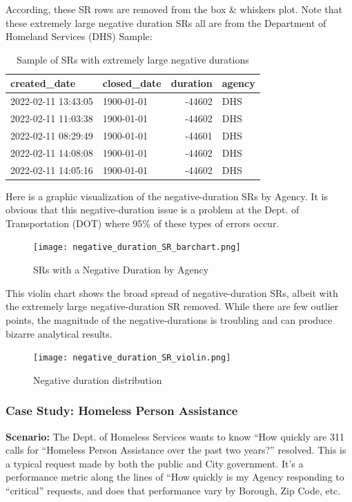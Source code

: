 \documentclass[12pt, titlepage]{article}
\begin{document}
According, these  SR rows are removed from the box \& whiskers plot. Note that these extremely large negative duration SRs all
are from the Department of Homeland Services (DHS) Sample: 

\begin{table}[H]
    \centering
    \small
    \begin{tabular}{l l r l}
        \toprule
        \textbf{created\_date} & \textbf{closed\_date} & \textbf{duration} & \textbf{agency} \\
	        \midrule
	        2022-02-11 13:43:05 & 1900-01-01 & -44602 & DHS \\
	        2022-02-11 11:03:38 & 1900-01-01 & -44602 & DHS \\
	        2022-02-11 08:29:49 & 1900-01-01 & -44601 & DHS \\
	        2022-02-11 14:08:08 & 1900-01-01 & -44602 & DHS \\
	        2022-02-11 14:05:16 & 1900-01-01 & -44602 & DHS \\
	        \bottomrule
    \end{tabular}
    \caption{Sample of SRs with extremely large negative durations}
    \label{tab:extreme_negative_durations}
\end{table}

Here is a graphic visualization of the negative-duration SRs by Agency. It is obvious that this
negative-duration issue is a problem at the Dept. of Transportation (DOT) where 95\% of these
types of errors occur. 

\begin{figure}[H]
 	 \centering
	  \texttt{[image: negative\_duration\_SR\_barchart.png]}
	  \caption{SRs with a Negative Duration by Agency}
	  \label{fig:negative-duration}
\end{figure}

This violin chart shows the broad spread of negative-duration SRs, albeit with the extremely large 
negative-duration SR removed. While there are few outlier points, the magnitude of the negative-durations
is troubling and can produce bizarre analytical results.

\begin{figure}[H]
 	 \centering
	  \texttt{[image: negative\_duration\_SR\_violin.png]}
	  \caption{Negative duration distribution}
	  \label{fig:negative-duration-violin}
\end{figure}


\subsubsection{Case Study: Homeless Person Assistance}
		\textbf{Scenario:} The Dept. of Homeless Services wants to know ``How quickly are 311 calls for ``Homeless Person
		Assistance over the past two years?'' resolved. This is a typical request made by both the public and City government. It's a performance metric along the lines
		of ``How quickly is my Agency responding to ``critical'' requests, and does that performance vary by Borough, Zip Code, etc. 
\end{document}
